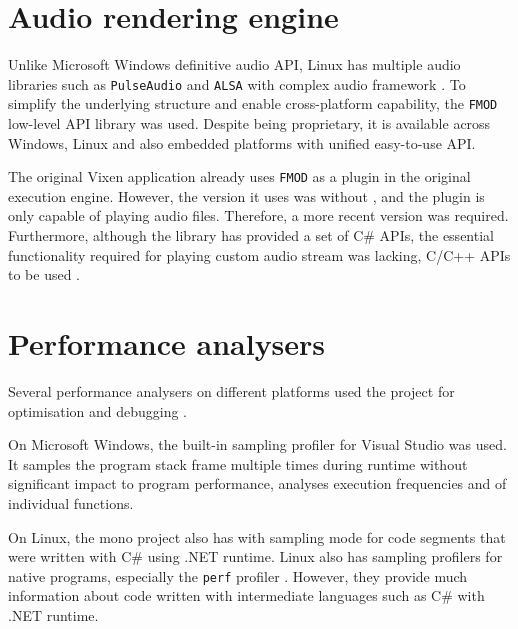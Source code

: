\section{Audio rendering engine}

Unlike Microsoft Windows definitive audio API, Linux has multiple audio libraries such as \texttt{PulseAudio} \cite{developers2013pulseaudio} and \texttt{ALSA} \cite{alsa} with complex audio framework . To simplify the underlying structure and enable cross-platform capability, the \texttt{FMOD} \cite{fmod} low-level API library was used. Despite being proprietary, it is available across Windows, Linux and also  embedded platforms with unified easy-to-use API.

The original Vixen application already uses \texttt{FMOD} as a plugin in the original execution engine. However, the version it uses was  without , and the plugin is only capable of playing audio files. Therefore, a more recent version was required. Furthermore, although the library has provided a set of C\# APIs,  the essential functionality required for playing custom audio stream was lacking, C/C++ APIs  to be used .

\section{Performance analysers}

Several performance analysers on different platforms  used  the project for optimisation and debugging .

On Microsoft Windows, the built-in sampling profiler for Visual Studio was used. It samples the program stack frame multiple times during runtime without significant impact to program performance, analyses execution frequencies and  of individual functions.

On Linux, the mono project also has  with sampling mode for  code segments that were written with C\# using .NET runtime. Linux also has sampling profilers for native programs, especially the \texttt{perf} profiler \cite{de2010new}. However, they  provide much information about code written with intermediate languages such as C\# with .NET runtime. 

